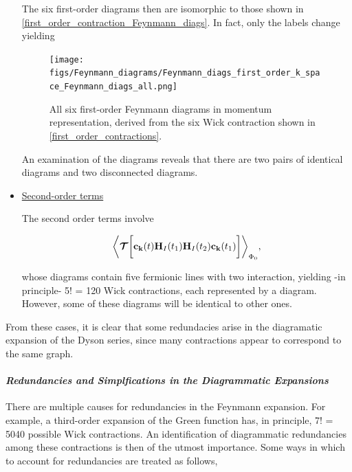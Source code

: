 \documentclass{homework}
\begin{document}
\begin{itemize}
The six first-order diagrams then are isomorphic to those shown in \cref{first_order_contraction_Feynmann_diags}. 
In fact, only the labels change yielding 

\begin{figure}[H]
    \centering
    \texttt{[image: figs/Feynmann\_diagrams/Feynmann\_diags\_first\_order\_k\_space\_Feynmann\_diags\_all.png]}
    \caption{All six first-order Feynmann diagrams in momentum representation, derived from the six Wick contraction shown in \cref{first_order_contractions}.}
\end{figure}

An examination of the diagrams reveals that there are two pairs of identical diagrams and two disconnected diagrams. \\

\item \underline{Second-order terms}

The second order terms involve 

\begin{equation}
    \bigg \langle \bm{\mathcal{T}} \bigg[ {\bf c}_{{\bf k}}(t) {\bf H}_I(t_1){\bf H}_I(t_2) {\bf c}_{{\bf k}}(t_1)
    \bigg]\bigg \rangle_{{\Phi_0}},
\end{equation}

whose diagrams contain five fermionic lines with two interaction, yielding -in principle- 5! = 120 Wick contractions, each represented by a diagram. However, some of these diagrams will be identical to other ones. \\

\end{itemize}

From these cases, it is clear that some redundacies arise in the diagramatic expansion of the Dyson series, since many contractions appear to correspond to the same graph. \\

\paragraph{\textit{Redundancies and Simplfications in the Diagrammatic Expansions}}

There are multiple causes for redundancies in the Feynmann expansion. For example, a third-order expansion of the Green function has, in principle, 7! = 5040 possible Wick contractions. An identification of diagrammatic redundancies among these contractions is then of the utmost importance. Some ways in which to account for redundancies are treated as follows,
\end{document}

